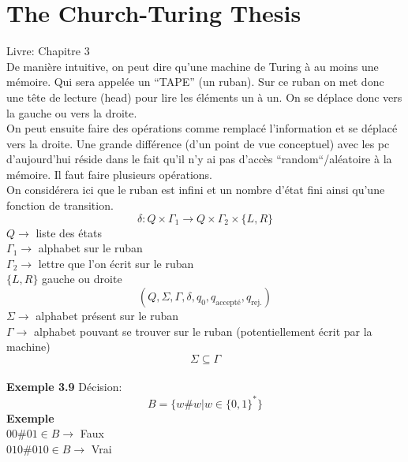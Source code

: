 \documentclass[a4paper,12pt]{article}
\begin{document}
\section{The Church-Turing Thesis}
  Livre: Chapitre 3\\
  De manière intuitive, on peut dire qu'une machine de Turing à au moins une mémoire.  Qui sera appelée un ``TAPE'' (un ruban).  Sur ce ruban on met donc une tête de lecture (head) pour lire les éléments un à un.  On se déplace donc vers la gauche ou vers la droite.\\
  On peut ensuite faire des opérations comme remplacé l'information et se déplacé vers la droite.  Une grande différence (d'un point de vue conceptuel) avec les pc d'aujourd'hui réside dans le fait qu'il n'y ai pas d'accès ``random``/aléatoire à la mémoire.  Il faut faire plusieurs opérations.\\
  On considérera ici que le ruban est infini et un nombre d'état fini ainsi qu'une fonction de transition.
  $$\delta : Q \times \Gamma_1 \rightarrow Q \times \Gamma_2 \times \{L, R\}$$
  $Q \rightarrow$ liste des états\\
  $\Gamma_1 \rightarrow$ alphabet sur le ruban\\
  $\Gamma_2 \rightarrow$ lettre que l'on écrit sur le ruban\\
  $\{L, R\}$ gauche ou droite\\
  $$(Q, \Sigma, \Gamma, \delta, q_0, q_{\text{accepté}}, q_{\text{rej.}})$$
  $\Sigma \rightarrow$ alphabet présent sur le ruban\\
  $\Gamma \rightarrow$ alphabet pouvant se trouver sur le ruban (potentiellement écrit par la machine)\\
  $$\Sigma \subseteq \Gamma$$\\
  \textbf{Exemple 3.9}
  Décision:
  $$B = \{w \# w | w \in \{0, 1\}^*\}$$
  \textbf{Exemple}\\
  $00\#01 \in B \rightarrow$ Faux\\
  $010\#010 \in B \rightarrow$ Vrai\\
  \\
\end{document}
